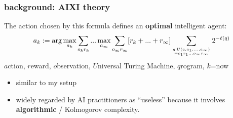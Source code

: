 \documentclass{beamer}
\begin{document}
\begin{frame}
\frametitle{background: AIXI theory}
\begin{theorem}[Hutter 2000]
The action chosen by this formula defines an \textbf{optimal} intelligent agent: \\
\begin{equation}
a_k := \arg \max_{a_k} \sum_{o_k r_k} ... \max_{a_\infty} \sum_{o_\infty r_\infty} [r_k + ... + r_\infty] \sum_{{q: U(q,a_1,...,a_\infty)}\atop{= o_1 r_1 ...o_\infty r_\infty}} 2^{-\ell(q)}
\end{equation}
$a$ction, $r$eward, $o$bservation, $U$niversal Turing Machine, $q$rogram, $k$=now
\end{theorem}
\begin{itemize}
	\item similar to my setup
	\item widely regarded by AI practitioners as ``useless'' because it involves \textbf{algorithmic} / Kolmogorov complexity.
\end{itemize}
\end{frame}
\end{document}
